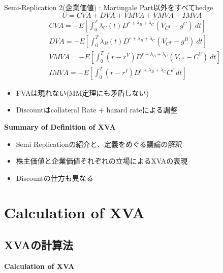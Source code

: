 \documentclass[driverfallback=dvipdfmx,cjk]{beamer}
\begin{document}
\begin{frame}
    Semi-Replication 2(企業価値) : Martingale Part以外をすべてhedge
   $$ U = CVA + DVA + VMVA + VMVA + IMVA$$
   \begin{align*}
    &CVA = -E[\int_0^T \lambda_C(t) D^{r + \lambda_B + \lambda_C}(V_{C^V}-g^C) \ dt]\\
    &DVA = -E[\int_0^T \lambda_B(t) D^{r + \lambda_B + \lambda_C}(V_{C^V}-g^B) \ dt]\\
    &VMVA = -E[\int_0^T (r - r^V) D^{r + \lambda_B + \lambda_C}(V_{C^V}-C^V) \ dt]\\
    &IMVA = -E[\int_0^T (r - r^I) D^{r + \lambda_B + \lambda_C} C^I \  dt]
   \end{align*}
   \begin{itemize}
       \item FVAは現れない(MM定理にも矛盾しない)
       \item Discountはcollateral Rate + hazard rateによる調整
   \end{itemize}
\end{frame}

\begin{frame}
\textbf{Summary of Definition of XVA}
\begin{itemize}
    \item Semi Replicationの紹介と、定義をめぐる議論の解釈
    \item 株主価値と企業価値それぞれの立場によるXVAの表現
    \item Discountの仕方も異なる
\end{itemize}
\end{frame}

\section{Calculation of XVA} 
\subsection{XVAの計算法}
\begin{frame}
   \textbf{Calculation of XVA} 
\end{frame}
\end{document}
